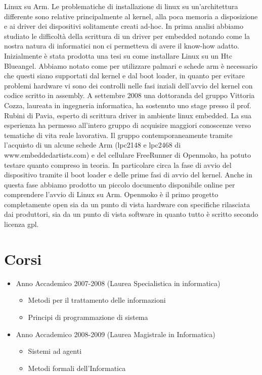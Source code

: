 \documentclass[a4paper,12pt]{article}
\renewcommand{\aa }{\`{a} }
\newcommand{\ea }{\`{e} }
\begin{document}
Linux su Arm.
Le problematiche di installazione di linux su un'architettura differente sono relative principalmente al kernel, alla poca memoria a disposizione e ai driver dei dispositivi solitamente creati ad-hoc. In prima analisi abbiamo studiato le difficolt\aa della scrittura di un driver per embedded notando come la nostra natura di informatici non ci permetteva di avere il know-how adatto.
Inizialmente \ea stata prodotta una tesi su come installare Linux su un Htc Blueangel. Abbiamo notato come per utilizzare palmari e schede arm \ea necessario che questi siano supportati dal kernel e dal boot loader, in quanto per evitare problemi hardware vi sono dei controlli nelle fasi inziali dell'avvio del kernel con codice scritto in assembly.
A settembre 2008 una dottoranda del gruppo Vittoria Cozza, laureata in ingegneria informatica, ha sostenuto uno stage presso il prof. Rubini di Pavia, esperto di scrittura driver in ambiente linux embedded. La sua esperienza ha permesso all'intero gruppo di acquisire maggiori conoscenze verso tematiche di vita reale lavorativa. Il gruppo contemporaneamente tramite l'acquisto di un alcune schede Arm (lpc2148 e lpc2468 di  www.embeddedartists.com) e del cellulare FreeRunner di Openmoko, ha potuto testare quanto compreso in teoria. In particolare circa la fase di avvio del dispositivo tramite il boot loader e delle prime fasi di avvio del kernel. Anche in questa fase abbiamo prodotto un piccolo documento disponibile online per comprendere l'avvio di Linux su Arm.
Openmoko \ea il primo progetto completamente open sia da un punto di vista hardware con specifiche rilasciata dai produttori, sia da un punto di vista software in quanto tutto \ea scritto secondo licenza gpl.


\section*{Corsi}
\begin{itemize}
\item Anno Accademico 2007-2008 (Laurea Specialistica in informatica)
\begin{itemize}
 \item Metodi per il trattamento delle informazioni
\item Principi di programmazione di sistema
\end{itemize}
\item Anno Accademico 2008-2009 (Laurea Magistrale in Informatica)
\begin{itemize}
\item Sistemi ad agenti
\item Metodi formali dell'Informatica
\end{itemize}

\end{itemize}
\end{document}
